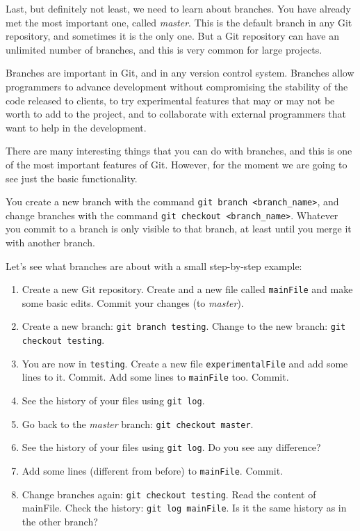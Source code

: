 Last, but definitely not least, we need to learn about branches. You
have already met the most important one, called \emph{master}. This is
the default branch in any Git repository, and sometimes it is the only
one. But a Git repository can have an unlimited number of branches,
and this is very common for large projects. 

Branches are important in Git, and in any version control
system. Branches allow programmers to advance development without
compromising the stability of the code released to clients, to try
experimental features that may or may not be worth to add to the
project, and to collaborate with external programmers that want to
help in the development. 

There are many interesting things that you can do with branches, and
this is one of the most important features of Git. However, for the
moment we are going to see just the basic functionality. 

You create a new branch with the command 
\verb+git branch <branch_name>+, and change branches with the command
\verb+git checkout <branch_name>+. Whatever you commit to a branch is
only visible to that branch, at least until you merge it with another
branch. 

Let's see what branches are about with a small step-by-step example: 

\begin{enumerate}
\item Create a new Git repository. Create and a new file called
  \verb+mainFile+ and make some
  basic edits. Commit your changes (to \emph{master}). 
\item Create a new branch: \verb+git branch testing+. Change to the
  new branch: \verb+git checkout testing+.
\item You are now in \verb+testing+. Create a new file
  \verb+experimentalFile+ and add some lines to it. Commit. 
  Add some lines
  to \verb+mainFile+ too. Commit.
\item See the history of your files using \verb+git log+.
\item Go back to the \emph{master} branch: 
  \verb+git checkout master+. 
\item See the history of your files using \verb+git log+. Do you see
  any difference?
\item Add some lines (different from before) to
  \verb+mainFile+. Commit.
\item Change branches again: \verb+git checkout testing+. Read the
  content of mainFile. Check the history: \verb+git log mainFile+. Is
  it the same history as in the other branch?
\end{enumerate}

